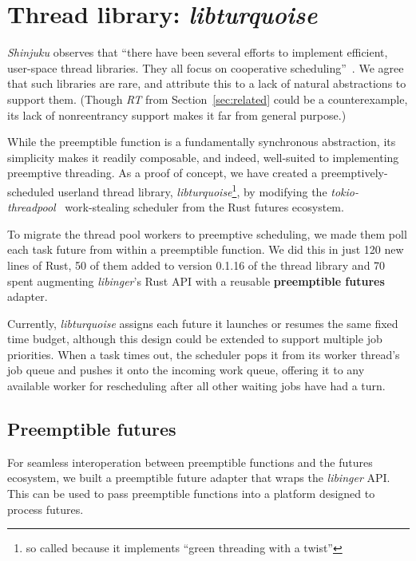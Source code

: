 \section{Thread library: \textit{libturquoise}}
\label{sec:libturquoise}

\textit{Shinjuku} observes that ``there have been several efforts to implement
efficient, user-space thread libraries.  They all focus on cooperative
scheduling''~\cite{Kaffes:nsdi2019}.  We agree that such libraries are rare, and
attribute this to a lack of natural abstractions to support them.  (Though
\textit{RT} from Section~\ref{sec:related} could be a counterexample, its lack of
nonreentrancy support makes it far from general purpose.)

While the preemptible function is a fundamentally synchronous abstraction, its
simplicity makes it readily composable, and indeed, well-suited to implementing
preemptive threading.  As a proof of concept, we have created a
preemptively-scheduled userland thread library, \textit{libturquoise}\footnote{so
called because it implements ``green threading with a twist''}, by modifying the
\textit{tokio-threadpool}~\cite{www-tokio-threadpool} work-stealing scheduler from
the Rust futures ecosystem.

To migrate the thread pool workers to preemptive scheduling, we made them poll each
task future from within a preemptible function.  We did this in
just 120 new lines of Rust, 50 of them added to version 0.1.16 of the thread library
and
70 spent augmenting \textit{libinger}'s Rust API with a reusable \textbf{preemptible
futures} adapter.

Currently, \textit{libturquoise} assigns each future it launches or resumes the same
fixed time budget, although this design could be extended to support
multiple job priorities.  When a task times out, the scheduler pops it from its
worker thread's job queue and pushes it onto the incoming work queue,
offering it to any available worker for rescheduling after all other waiting jobs
have had a turn.


\subsection{Preemptible futures}

For seamless interoperation between preemptible functions and the futures ecosystem,
we built a preemptible future adapter that wraps the \textit{libinger} API.  This
can be used to pass preemptible functions into a platform designed to process
futures.

